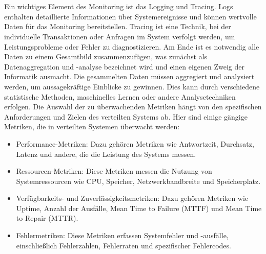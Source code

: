 \\\\
Ein wichtiges Element des Monitoring ist das Logging und Tracing. Logs enthalten detaillierte Informationen über Systemereignisse und können wertvolle Daten für das Monitoring bereitstellen. Tracing ist eine Technik, bei der individuelle Transaktionen oder Anfragen im System verfolgt werden, um Leistungsprobleme oder Fehler zu diagnostizieren.
Am Ende ist es notwendig alle Daten zu einem Gesamtbild zusammenzufügen, was zunächst als Datenaggregation und -analyse bezeichnet wird und einen eigenen Zweig der Informatik ausmacht. Die gesammelten Daten müssen aggregiert und analysiert werden, um aussagekräftige Einblicke zu gewinnen. Dies kann durch verschiedene statistische Methoden, maschinelles Lernen oder andere Analysetechniken erfolgen.
Die Auswahl der zu überwachenden Metriken hängt von den spezifischen Anforderungen und Zielen des verteilten Systems ab. Hier sind einige gängige Metriken, die in verteilten Systemen überwacht werden:
\begin{itemize}
\item Performance-Metriken: Dazu gehören Metriken wie Antwortzeit, Durchsatz, Latenz und andere, die die Leistung des Systems messen.
\item Ressourcen-Metriken: Diese Metriken messen die Nutzung von Systemressourcen wie CPU, Speicher, Netzwerkbandbreite und Speicherplatz.
\item Verfügbarkeits- und Zuverlässigkeitsmetriken: Dazu gehören Metriken wie Uptime, Anzahl der Ausfälle, Mean Time to Failure (MTTF) und Mean Time to Repair (MTTR).
\item Fehlermetriken: Diese Metriken erfassen Systemfehler und -ausfälle, einschließlich Fehlerzahlen, Fehlerraten und spezifischer Fehlercodes.
\end{itemize}

